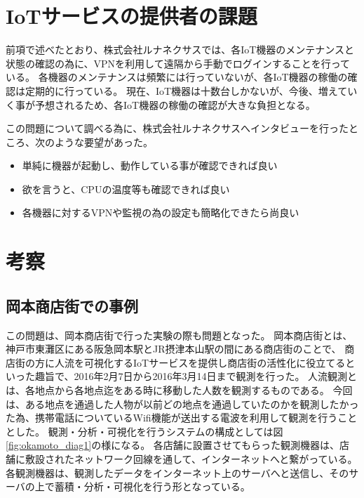 \section{IoTサービスの提供者の課題}
前項で述べたとおり、株式会社ルナネクサスでは、各IoT機器のメンテナンスと状態の確認の為に、VPNを利用して遠隔から手動でログインすることを行っている。
各機器のメンテナンスは頻繁には行っていないが、各IoT機器の稼働の確認は定期的に行っている。
現在、IoT機器は十数台しかないが、今後、増えていく事が予想されるため、各IoT機器の稼働の確認が大きな負担となる。

この問題について調べる為に、株式会社ルナネクサスへインタビューを行ったところ、次のような要望があった。
\begin{itemize}
\item 単純に機器が起動し、動作している事が確認できれば良い
\item 欲を言うと、CPUの温度等も確認できれば良い
\item 各機器に対するVPNや監視の為の設定も簡略化できたら尚良い
\end{itemize}

\section{考察}

\subsection{岡本商店街での事例}
この問題は、岡本商店街で行った実験の際も問題となった。
岡本商店街とは、神戸市東灘区にある阪急岡本駅とJR摂津本山駅の間にある商店街のことで、
商店街の方に人流を可視化するIoTサービスを提供し商店街の活性化に役立てるといった趣旨で、2016年2月7日から2016年3月14日まで観測を行った。
人流観測とは、各地点から各地点迄をある時に移動した人数を観測するものである。
今回は、ある地点を通過した人物が以前どの地点を通過していたのかを観測したかった為、携帯電話についているWifi機能が送出する電波を利用して観測を行うこととした。
観測・分析・可視化を行うシステムの構成としては図\ref{fig:okamoto_diag1}の様になる。
各店舗に設置させてもらった観測機器は、店舗に敷設されたネットワーク回線を通して、インターネットへと繋がっている。
各観測機器は、観測したデータをインターネット上のサーバへと送信し、そのサーバの上で蓄積・分析・可視化を行う形となっている。
\medskip

